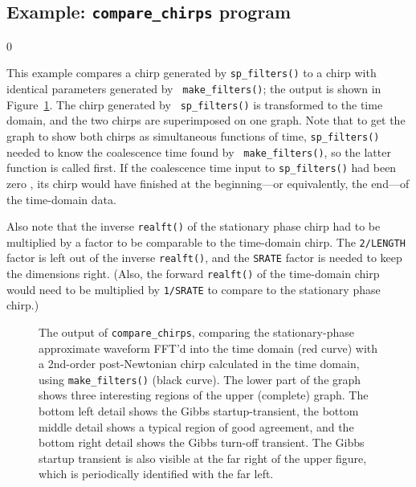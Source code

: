 \subsection{Example: {\tt compare\_chirps} program}
\label{ss:compare_chirps}
\setcounter{equation}0

This example compares a chirp generated by {\tt sp\_filters()}
to a chirp with identical parameters generated by {\tt
make\_filters()}; the output is shown in
Figure~\ref{f:compare_chirps}.  The chirp generated by {\tt
sp\_filters()} is transformed to the time domain, and the two chirps
are superimposed on one graph.
Note that to get the graph to show both chirps as simultaneous functions
of time, 
{\tt sp\_filters()} needed to know the coalescence time found by {\tt
make\_filters()}, so the latter function is called first.  If the
coalescence time input to {\tt sp\_filters()} had been zero , its chirp
would have finished at the beginning---or equivalently, the end---of
the time-domain data.

Also note that the inverse {\tt realft()} of the stationary phase chirp
had to be multiplied by a factor to be comparable to the time-domain chirp.
The {\tt 2/LENGTH} factor is left out of the inverse {\tt realft()},
and the {\tt SRATE} factor is needed to keep the dimensions right.
(Also, the forward {\tt realft()} of the time-domain chirp would need to be
multiplied by {\tt 1/SRATE} to compare to the stationary phase chirp.)

\begin{figure}
\begin{center}
\caption{ \label{f:compare_chirps}
The output of {\tt compare\_chirps}, comparing the stationary-phase
approximate waveform FFT'd into the time domain (red curve) with a
2nd-order post-Newtonian chirp calculated in the time domain, using
{\tt make\_filters()} (black curve).  The lower part of the graph shows
three interesting regions of the upper (complete) graph.  The bottom
left detail shows the Gibbs startup-transient, the bottom middle detail
shows a typical region of good agreement, and the bottom right detail
shows the Gibbs turn-off transient.  The Gibbs startup transient is
also visible at the far right of the upper figure, which is
periodically identified with the far left.  }
\end{center}
\end{figure}



